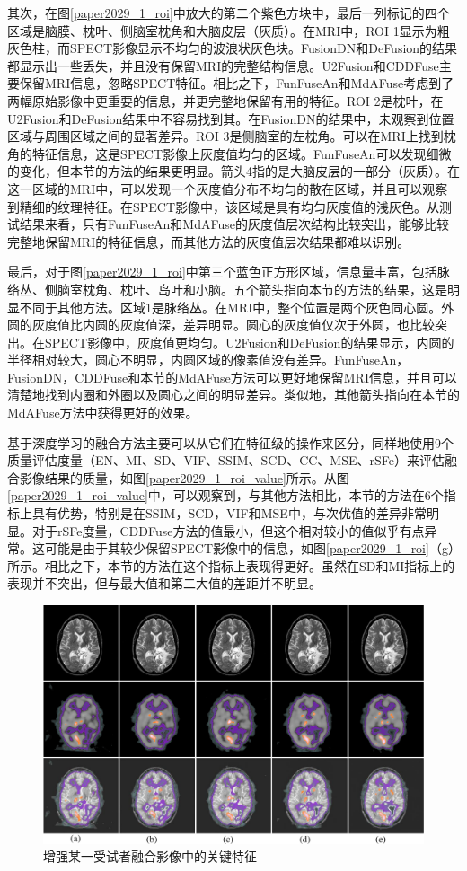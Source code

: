 其次，在图\ref{paper2029_1_roi}中放大的第二个紫色方块中，最后一列标记的四个区域是脑膜、枕叶、侧脑室枕角和大脑皮层（灰质）。在MRI中，ROI 1显示为粗灰色柱，而SPECT影像显示不均匀的波浪状灰色块。FusionDN和DeFusion的结果都显示出一些丢失，并且没有保留MRI的完整结构信息。U2Fusion和CDDFuse主要保留MRI信息，忽略SPECT特征。相比之下，FunFuseAn和MdAFuse考虑到了两幅原始影像中更重要的信息，并更完整地保留有用的特征。ROI 2是枕叶，在U2Fusion和DeFusion结果中不容易找到其。在FusionDN的结果中，未观察到位置区域与周围区域之间的显著差异。ROI 3是侧脑室的左枕角。可以在MRI上找到枕角的特征信息，这是SPECT影像上灰度值均匀的区域。FunFuseAn可以发现细微的变化，但本节的方法的结果更明显。箭头4指的是大脑皮层的一部分（灰质）。在这一区域的MRI中，可以发现一个灰度值分布不均匀的散在区域，并且可以观察到精细的纹理特征。在SPECT影像中，该区域是具有均匀灰度值的浅灰色。从测试结果来看，只有FunFuseAn和MdAFuse的灰度值层次结构比较突出，能够比较完整地保留MRI的特征信息，而其他方法的灰度值层次结果都难以识别。

最后，对于图\ref{paper2029_1_roi}中第三个蓝色正方形区域，信息量丰富，包括脉络丛、侧脑室枕角、枕叶、岛叶和小脑。五个箭头指向本节的方法的结果，这是明显不同于其他方法。区域1是脉络丛。在MRI中，整个位置是两个灰色同心圆。外圆的灰度值比内圆的灰度值深，差异明显。圆心的灰度值仅次于外圆，也比较突出。在SPECT影像中，灰度值更均匀。U2Fusion和DeFusion的结果显示，内圆的半径相对较大，圆心不明显，内圆区域的像素值没有差异。FunFuseAn，FusionDN，CDDFuse和本节的MdAFuse方法可以更好地保留MRI信息，并且可以清楚地找到内圈和外圈以及圆心之间的明显差异。类似地，其他箭头指向在本节的MdAFuse方法中获得更好的效果。

基于深度学习的融合方法主要可以从它们在特征级的操作来区分，同样地使用9个质量评估度量（EN、MI、SD、VIF、SSIM、SCD、CC、MSE、rSFe）来评估融合影像结果的质量，如图\ref{paper2029_1_roi_value}所示。从图\ref{paper2029_1_roi_value}中，可以观察到，与其他方法相比，本节的方法在6个指标上具有优势，特别是在SSIM，SCD，VIF和MSE中，与次优值的差异非常明显。对于rSFe度量，CDDFuse方法的值最小，但这个相对较小的值似乎有点异常。这可能是由于其较少保留SPECT影像中的信息，如图\ref{paper2029_1_roi}（g）所示。相比之下，本节的方法在这个指标上表现得更好。虽然在SD和MI指标上的表现并不突出，但与最大值和第二大值的差距并不明显。


    \begin{figure}[htbp]
      \centering
      \includegraphics[width=0.9\linewidth]{figs/paper2029color.pdf}
      \caption{增强某一受试者融合影像中的关键特征}\label{paper2029_color_i}
    \end{figure}

